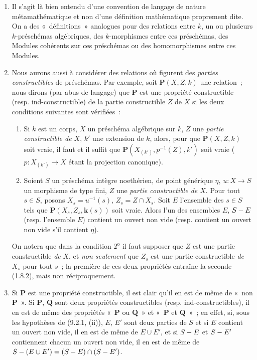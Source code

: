 \begin{remarks}[9.2.2]
\label{IV.9.2.2-fr}
\begin{enumerate}[label=(\roman*)]
  \item Il s'agit là bien entendu d'une convention de langage de nature
  métamathématique et non d'une définition mathématique proprement dite. On a
  des «~définitions~» analogues pour des relations entre $k$, un ou plusieurs
  $k$-préschémas algébriques, des $k$-morphismes entre ces préschémas, des
  Modules cohérents sur ces préschémas ou des homomorphismes entre ces Modules.

  \item Nous aurons aussi à considérer des relations où figurent des
  \emph{parties constructibles} de préschémas. Par exemple, soit
  $\boldsymbol{P}(X,Z,k)$ une relation~; nous dirons (par abus de langage) que
  $\boldsymbol{P}$ est une propriété constructible (resp. ind-constructible) de la
  partie constructible $Z$ de $X$ si les deux conditions suivantes sont
  vérifiées~:
  \begin{enumerate}[label=$\arabic*^{\mathrm o}$]
    \item Si $k$ est un corps, $X$ un préschéma algébrique sur $k$, $Z$ une
    \emph{partie constructible de $X$}, $k'$ une extension de $k$, alors, pour
    que $\boldsymbol{P}(X,Z,k)$ soit vraie, il faut et il suffit que
    $\boldsymbol{P}(X_{(k')},p^{-1}(Z),k')$ soit vraie
    ($p:X_{(k')}\to X$ étant la projection canonique).
    \item Soient $S$ un préschéma intègre noethérien, de point générique
    $\eta$, $u:X\to S$ un morphisme de type fini, $Z$ une
    \emph{partie constructible de $X$}. Pour tout $s\in S$, posons
    $X_s=u^{-1}(s)$, $Z_s=Z\cap X_s$. Soit $E$ l'ensemble des $s\in S$ tels
    que $\boldsymbol{P}(X_s,Z_s,\boldsymbol{k}(s))$ soit vraie. Alors l'un des ensembles $E$,
    $S- E$ (resp. l'ensemble $E$) contient un ouvert non vide (resp. contient
    un ouvert non vide s'il contient $\eta$).
  \end{enumerate}

  On notera que dans la condition $2^{\mathrm o}$ il faut supposer que $Z$ est
  une partie constructible \emph{de} $X$, et \emph{non seulement} que $Z_s$ est une partie
  constructible \emph{de} $X_s$ pour tout $s$~; la première de ces deux propriétés
  entraîne la seconde (1.8.2), mais non réciproquement.

  \item Si $\boldsymbol{P}$ est une propriété constructible, il est clair qu'il en
  est de même de «~non $\boldsymbol{P}$~». Si $\boldsymbol{P}$, $\boldsymbol{Q}$ sont deux
  propriétés constructibles (resp. ind-constructibles), il en est de même des
  propriétés «~$\boldsymbol{P}$ ou $\boldsymbol{Q}$~» et «~$\boldsymbol{P}$ et
  $\boldsymbol{Q}$~»~; en effet, si, sous les hypothèses de (9.2.1, (ii)), $E$,
  $E'$ sont deux parties de $S$ et si $E$ contient un ouvert non vide, il en
  est de même de $E\cup E'$, et si $S- E$ et $S- E'$ contiennent chacun un
  ouvert non vide, il en est de même de
  $S-(E\cup E')=(S- E)\cap(S- E')$.


\end{enumerate}
\end{remarks}
